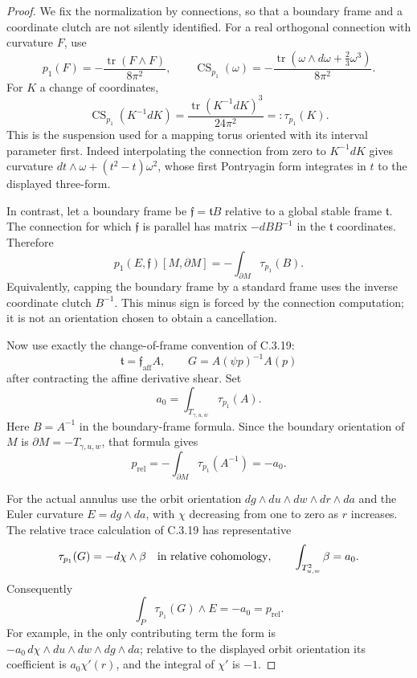 \begin{proof}
We fix the normalization by connections, so that a boundary
frame and a coordinate clutch are not silently identified.
For a real orthogonal connection with curvature $F$, use
\[
 p_1(F)=-\frac{\operatorname{tr}(F\wedge F)}{8\pi^2},
 \qquad
 \operatorname{CS}_{p_1}(\omega)
 =-\frac{\operatorname{tr}(\omega\wedge d\omega
                          +\tfrac23\omega^3)}{8\pi^2}.
\]
For $K$ a change of coordinates,
\[
 \operatorname{CS}_{p_1}(K^{-1}dK)
 =\frac{\operatorname{tr}(K^{-1}dK)^3}{24\pi^2}
 =:\tau_{p_1}(K).
\]
This is the suspension used for a mapping torus oriented
with its interval parameter first. Indeed interpolating
the connection from zero to $K^{-1}dK$ gives curvature
$dt\wedge\omega+(t^2-t)\omega^2$, whose first Pontryagin
form integrates in $t$ to the displayed three-form.

In contrast, let a boundary frame be
$\mathfrak f=\mathfrak t B$ relative to a global stable
frame $\mathfrak t$. The connection for which
$\mathfrak f$ is parallel has matrix $-dB B^{-1}$ in
the $\mathfrak t$ coordinates. Therefore
\[
 p_1(E,\mathfrak f)[M,\partial M]
 =-\int_{\partial M}\tau_{p_1}(B).
\]
Equivalently, capping the boundary frame by a standard
frame uses the inverse coordinate clutch $B^{-1}$.
This minus sign is forced by the connection computation;
it is not an orientation chosen to obtain a cancellation.

Now use exactly the change-of-frame convention of C.3.19:
\[
 \mathfrak t=\mathfrak f_{\mathrm{aff}} A,
 \qquad
 G=A(\psi p)^{-1}A(p)
\]
after contracting the affine derivative shear. Set
\[
 a_0=\int_{T_{\gamma,u,w}}\tau_{p_1}(A).
\]
Here $B=A^{-1}$ in the boundary-frame formula. Since
the boundary orientation of $M$ is
$\partial M=-T_{\gamma,u,w}$, that formula gives
\[
 p_{\mathrm{rel}}
 =-\int_{\partial M}\tau_{p_1}(A^{-1})
 =-a_0.
\]

For the actual annulus use the orbit orientation
$dg\wedge du\wedge dw\wedge dr\wedge da$ and the
Euler curvature $E=dg\wedge da$, with $\chi$ decreasing
from one to zero as $r$ increases. The relative trace
calculation of C.3.19 has representative
\[
 \tau_{p_1}(G)
 =-d\chi\wedge\beta
 \quad\hbox{in relative cohomology},
 \qquad
 \int_{T^2_{u,w}}\beta=a_0.
\]
Consequently
\[
 \int_P\tau_{p_1}(G)\wedge E=-a_0=p_{\mathrm{rel}}.
\]
For example, in the only contributing term the form is
$-a_0\,d\chi\wedge du\wedge dw\wedge dg\wedge da$;
relative to the displayed orbit orientation its coefficient
is $a_0\chi'(r)$, and the integral of $\chi'$ is $-1$.


\end{proof}
